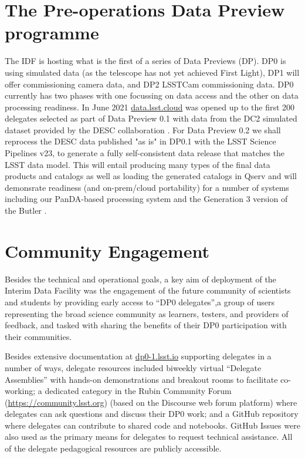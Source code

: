 \documentclass[11pt,twoside]{article}
\begin{document}
\section {The Pre-operations Data Preview programme}
The IDF is hosting what is the first of a series of Data Previews (DP). DP0 is using simulated data (as the telescope has not yet achieved First Light), DP1 will offer commissioning camera data,
and DP2 LSSTCam commissioning data.
DP0 currently has two phases\citep{RTN-001} with one focussing on data access and the other on data processing readiness.
In June 2021 \href{https://data.lsst.cloud}{data.lsst.cloud} was opened up to the first 200 delegates selected as part of Data Preview 0.1 with data from the DC2 simulated dataset provided by the DESC collaboration \citep{arXiv:2010.05926}.
For Data Preview 0.2 we shall reprocess the DESC data published "as is" in DP0.1 with the LSST Science Pipelines v23, to generate a fully self-consistent data release that matches the LSST data model.
This will entail producing many types of the final data products and catalogs as well as loading the  generated catalogs in Qserv and will demonsrate readiness (and on-prem/cloud portability) for a number of systems including our PanDA-based processing system and the Generation 3 version of the Butler \citep{2019ASPC..523..653J}.

\section{Community Engagement }

Besides the technical and operational goals, a key aim of deployment of the Interim Data Facility was the engagement of the future community of scientists and students by providing early access to ``DP0 delegates'',a group of users representing the broad science community as learners, testers, and providers of feedback, and tasked with sharing the benefits of their DP0 participation with their communities.

Besides extensive documentation at \href{https://dp0-1.lsst.io}{dp0-1.lsst.io} supporting delegates in a number of ways, delegate resources included biweekly virtual ``Delegate Assemblies'' with hands-on demonstrations and breakout rooms to facilitate co-working; a dedicated category in the Rubin Community Forum (\url{https://community.lsst.org}) (based on the Discourse web forum platform) where delegates can ask questions and discuss their DP0 work; and a GitHub repository where delegates can contribute to shared code and notebooks.
GitHub Issues were also used as the primary means for delegates to request technical assistance. All of the delegate pedagogical resources are publicly accessible.
\end{document}
